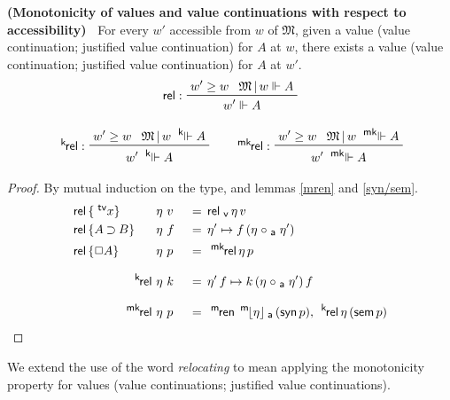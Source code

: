 \documentclass{entcs}
\numberwithin{equation}{thm}
\newcommand{\tsf}[1]{\textsf{\upshape{#1}}}
\newcommand{\stsf}[1]{\tsf{\small{#1}}}
\renewcommand{\:}{\mathrel{:}}
\newcommand{\tyrule}[1]{\prftree[l]{${#1} \:\,$}}
\newcommand{\0}{\varnothing}
\newcommand{\tvar}{\operatorname{^{\stsf{tv}\mkern-4mu}}}
\newcommand{\imp}{\mathbin{\supset}}
\newcommand{\sq}{\Box}
\newcommand{\mren}{\operatorname{^{\stsf{m}\mkern-2mu}\tsf{ren}}}
\newcommand{\M}{\mathfrak{M}}
\newcommand{\compa}{\mathrel{\circ_{\stsf{a}}}}
\newcommand{\relv}{\operatorname{\tsf{rel}_{\stsf{v}}}}
\newcommand{\mpeeka}[1]{\mathopen{^{\stsf{m}\mkern-3mu}\lfloor}{#1}\mathclose{\rfloor_{\mkern-2mu\stsf{a}}}}
\newcommand{\ee}{\mathrel{\Vdash}}
\newcommand{\kee}{\mathrel{^{\stsf{k}\mkern-6mu}\Vdash}}
\newcommand{\mkee}{\mathrel{^{\stsf{mk}\mkern-6mu}\Vdash}}
\newcommand{\syn}{\operatorname{\tsf{syn}}}
\newcommand{\sem}{\operatorname{\tsf{sem}}}
\newcommand{\rel}{\operatorname{\tsf{rel}}}
\newcommand{\krel}{\operatorname{^{\stsf{k}\mkern-2mu}\tsf{rel}}}
\newcommand{\mkrel}{\operatorname{^{\stsf{mk}\mkern-2mu}\tsf{rel}}}
\begin{document}
\begin{lemma}
  \normalshape
  \textbf{(Monotonicity of values and value continuations with respect to accessibility)\ }
  \label{rel/krel/mkrel}
  For every $w'$ accessible from $w$ of $\M$, given a value (value continuation; justified value continuation) for $A$ at $w$, there exists a value (value continuation; justified value continuation) for $A$ at $w'$.
  \begin{gather*}
    \tyrule{\rel}{w' \ge w}{\M\,|\, w \ee A}{w' \ee A}\\[0.5\baselineskip]
    \tyrule{\krel}{w' \ge w}{\M\,|\, w \kee A}{w' \kee A}\qquad
    \tyrule{\mkrel}{w' \ge w}{\M\,|\, w \mkee A}{w' \mkee A}
  \end{gather*}
  \itshape
  \begin{proof}
    \normalshape
    By mutual induction on the type, and lemmas \ref{mren} and \ref{syn/sem}.
    \begin{alignat*}{3}
      & \rlap{$\rel\, \{\tvar x\}$}   &\,\eta\, &\,v \,&&=\, \relv \eta\, v\\
      & \rlap{$\rel\, \{A \imp B\}$}  &\,\eta\, &\,f \,&&=\, \eta' \mapsto f\, (\eta \compa \eta')\\
      & \rlap{$\rel\, \{\sq A\}$}     &\,\eta\, &\,p \,&&=\, \mkrel \eta\, p\\[0.5\baselineskip]
      && \qquad\quad \krel             \,\eta\, &\,k \,&&=\, \eta'\, f \mapsto k\, (\eta \compa \eta')\, f\\[0.5\baselineskip]
      && \qquad\quad \mkrel            \,\eta\, &\,p \,&&=\, \mren\, \mpeeka{\eta}\, (\syn p),\, \krel \eta\, (\sem p)
    \end{alignat*}
  \end{proof}
\end{lemma}

\noindent
We extend the use of the word \emph{relocating} to mean applying the monotonicity property for values (value continuations; justified value continuations).
\end{document}
